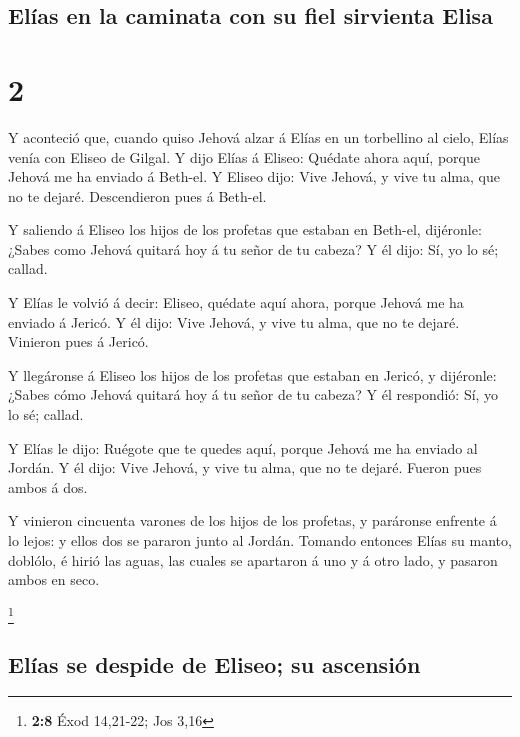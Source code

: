 \hypertarget{eluxedas-en-la-caminata-con-su-fiel-sirvienta-elisa}{%
\subsection{Elías en la caminata con su fiel sirvienta
Elisa}\label{eluxedas-en-la-caminata-con-su-fiel-sirvienta-elisa}}

\hypertarget{section-1}{%
\section{2}\label{section-1}}

 Y aconteció que, cuando quiso Jehová alzar á Elías en un
torbellino al cielo, Elías venía con Eliseo de Gilgal.  Y
dijo Elías á Eliseo: Quédate ahora aquí, porque Jehová me ha enviado á
Beth-el. Y Eliseo dijo: Vive Jehová, y vive tu alma, que no te dejaré.
Descendieron pues á Beth-el.

 Y saliendo á Eliseo los hijos de los profetas que estaban
en Beth-el, dijéronle: ¿Sabes como Jehová quitará hoy á tu señor de tu
cabeza? Y él dijo: Sí, yo lo sé; callad.

 Y Elías le volvió á decir: Eliseo, quédate aquí ahora,
porque Jehová me ha enviado á Jericó. Y él dijo: Vive Jehová, y vive tu
alma, que no te dejaré. Vinieron pues á Jericó.

 Y llegáronse á Eliseo los hijos de los profetas que
estaban en Jericó, y dijéronle: ¿Sabes cómo Jehová quitará hoy á tu
señor de tu cabeza? Y él respondió: Sí, yo lo sé; callad.

 Y Elías le dijo: Ruégote que te quedes aquí, porque
Jehová me ha enviado al Jordán. Y él dijo: Vive Jehová, y vive tu alma,
que no te dejaré. Fueron pues ambos á dos.

 Y vinieron cincuenta varones de los hijos de los
profetas, y paráronse enfrente á lo lejos: y ellos dos se pararon junto
al Jordán.  Tomando entonces Elías su manto, doblólo, é
hirió las aguas, las cuales se apartaron á uno y á otro lado, y pasaron
ambos en seco.

\footnote{\textbf{2:8} Éxod 14,21-22; Jos 3,16}

\hypertarget{eluxedas-se-despide-de-eliseo-su-ascensiuxf3n}{%
\subsection{Elías se despide de Eliseo; su
ascensión}\label{eluxedas-se-despide-de-eliseo-su-ascensiuxf3n}}

